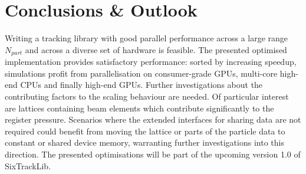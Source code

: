 \documentclass[a4paper,
               refpage,       %
               keeplastbox,   %
               ]{jacow}
\begin{document}
\section{Conclusions \& Outlook}
Writing a tracking library with good parallel performance across a large range $N_{part}$ and across a diverse set of hardware is feasible. The presented optimised implementation provides satisfactory performance:
sorted by increasing speedup, simulations profit from parallelisation on consumer-grade GPUs, multi-core high-end CPUs and finally high-end GPUs. 
Further investigations about the contributing factors to the scaling behaviour are needed. Of particular interest are lattices containing beam elements which contribute significantly to the register pressure. Scenarios where the extended interfaces for sharing data are not required could benefit from moving the lattice or parts of the particle data to constant or shared device memory, warranting further investigations into this direction. The presented optimisations will be part of the upcoming version 1.0 of SixTrackLib.

\end{document}
